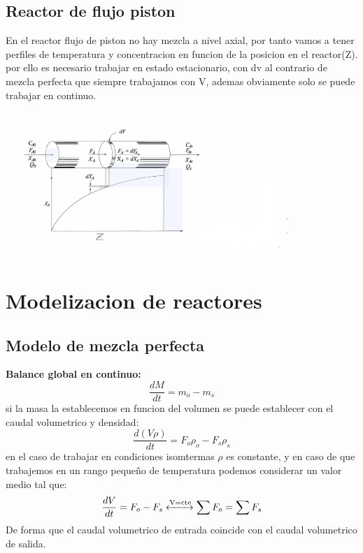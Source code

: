 \documentclass{report}
\begin{document}
\subsection{Reactor de flujo piston}
\begin{raggedright}
En el reactor flujo de piston no hay mezcla a nivel axial, por tanto vamos a tener perfiles de temperatura y concentracion en funcion de la posicion en el reactor(Z).
por ello es necesario trabajar en estado estacionario, con dv al contrario de mezcla perfecta que siempre trabajamos con V, ademas obviamente solo se puede trabajar en continuo.
\end{raggedright}
\begin{center}
	\includegraphics[width=0.8\textwidth]{RFP.png}
\end{center}

\section{Modelizacion de reactores}
\subsection{Modelo de mezcla perfecta}
\begin{raggedright}
	\vspace{1\baselineskip}
	\noindent \textbf{Balance global en continuo:}
	\begin{equation}
		\frac{dM}{dt}=m_o-m_s
	\end{equation}
	si la masa la establecemos en funcion del volumen se puede establecer con el caudal volumetrico y densidad:
	\begin{equation}
		\frac{d(V\rho)}{dt}=F_o\rho_o-F_s\rho_s
	\end{equation}
	en el caso de trabajar en condiciones isomtermas $\rho$ es constante, y en caso de que trabajemos en un rango pequeño de temperatura podemos considerar un valor medio tal que:
	\begin{equation}
		\frac{dV}{dt}=F_o-F_s \xleftrightarrow{\text{V=cte}} \sum F_o=\sum F_s
	\end{equation}
	De forma que el caudal volumetrico de entrada coincide con el caudal volumetrico de salida.
\end{raggedright}
 
\end{document}
